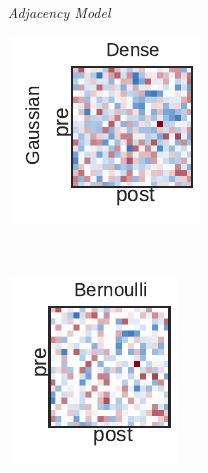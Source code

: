 \begin{figure}[t!]
  \centering
  \textit{~~~~~Adjacency Model} \\
  \hspace{1em}
  \begin{subfigure}[b]{1.25in}
    \centering
    \includegraphics[width=\textwidth]{figures/ch3/Dense-Gaussian.pdf}
  \end{subfigure}
  ~
  \hspace{-.1in}
  \begin{subfigure}[b]{1.10in}
    \centering
    \includegraphics[width=\textwidth]{figures/ch3/Bernoulli-Gaussian.pdf}

\end{subfigure}
\end{figure}
